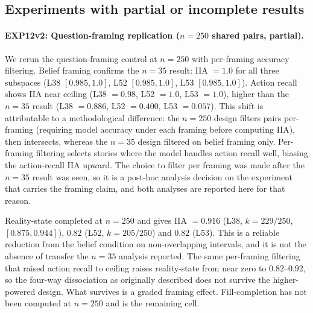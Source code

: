 \documentclass{article}
\begin{document}
\subsection{Experiments with partial or incomplete results}

\paragraph{EXP12v2: Question-framing replication ($n = 250$ shared pairs, partial).}
We rerun the question-framing control at $n = 250$ with per-framing accuracy filtering. Belief framing confirms the $n = 35$ result: IIA $= 1.0$ for all three subspaces (L38 $[0.985, 1.0]$, L52 $[0.985, 1.0]$, L53 $[0.985, 1.0]$). Action recall shows IIA near ceiling (L38 $= 0.98$, L52 $= 1.0$, L53 $= 1.0$), higher than the $n = 35$ result (L38 $= 0.886$, L52 $= 0.400$, L53 $= 0.057$). This shift is attributable to a methodological difference: the $n = 250$ design filters pairs per-framing (requiring model accuracy under each framing before computing IIA), then intersects, whereas the $n = 35$ design filtered on belief framing only. Per-framing filtering selects stories where the model handles action recall well, biasing the action-recall IIA upward. The choice to filter per framing was made after the $n = 35$ result was seen, so it is a post-hoc analysis decision on the experiment that carries the framing claim, and both analyses are reported here for that reason.

Reality-state completed at $n = 250$ and gives IIA $= 0.916$ (L38, $k = 229/250$, $[0.875, 0.944]$), $0.82$ (L52, $k = 205/250$) and $0.82$ (L53). This is a reliable reduction from the belief condition on non-overlapping intervals, and it is not the absence of transfer the $n = 35$ analysis reported. The same per-framing filtering that raised action recall to ceiling raises reality-state from near zero to $0.82$--$0.92$, so the four-way dissociation as originally described does not survive the higher-powered design. What survives is a graded framing effect. Fill-completion has not been computed at $n = 250$ and is the remaining cell.
\end{document}
